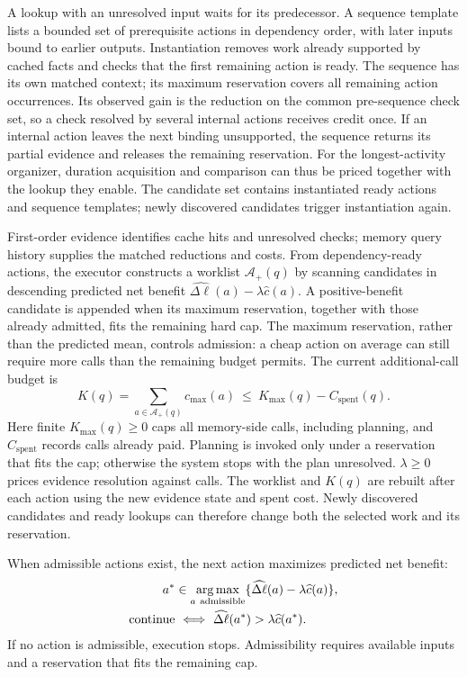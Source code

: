 A lookup with an unresolved input waits for its predecessor. A sequence
template lists a bounded set of prerequisite actions in dependency order,
with later inputs bound to earlier outputs. Instantiation removes work
already supported by cached facts and checks that the first remaining
action is ready. The sequence has its own matched context; its maximum
reservation covers all remaining action occurrences. Its observed gain
is the reduction on the common pre-sequence check set, so a check
resolved by several internal actions receives credit once.
If an internal action leaves the next binding unsupported, the sequence
returns its partial evidence and releases the remaining reservation.
For the longest-activity organizer, duration acquisition and comparison
can thus be priced together with the lookup they enable. The candidate
set contains instantiated ready actions and sequence templates; newly
discovered candidates trigger instantiation again.

First-order evidence identifies cache hits and unresolved checks;
memory query history supplies the matched reductions and costs.
From dependency-ready actions, the executor constructs a worklist
$\mathcal A_+(q)$ by scanning candidates in descending predicted net benefit
$\widehat{\Delta\ell}(a)-\lambda\widehat c(a)$.
A positive-benefit candidate is appended when its maximum reservation,
together with those already admitted, fits the remaining hard cap.
The maximum reservation, rather than the predicted mean, controls
admission: a cheap action on average can still require more calls than
the remaining budget permits.
The current additional-call budget is
\begin{equation}
\label{eq:new-adaptive-budget}
K(q)=\sum_{a\in\mathcal A_+(q)}c_{\max}(a)
\ \leq\ K_{\max}(q)-C_{\mathrm{spent}}(q).
\end{equation}
Here finite $K_{\max}(q)\geq0$ caps all memory-side calls, including planning, and
$C_{\mathrm{spent}}$ records calls already paid.
Planning is invoked only under a reservation that fits the cap; otherwise
the system stops with the plan unresolved.
$\lambda\geq0$ prices evidence resolution against calls.
The worklist and $K(q)$ are rebuilt after each action using the new
evidence state and spent cost. Newly discovered candidates and ready
lookups can therefore change both the selected work and its reservation.

When admissible actions exist, the next action maximizes predicted net benefit:
\begin{equation}
\label{eq:short}
\begin{aligned}
a^*&\in\operatorname*{arg\,max}_{a\ \mathrm{admissible}}
 \{\widehat{\Delta\ell}(a)-\lambda\widehat c(a)\},\\
\mathrm{continue}&\ \Longleftrightarrow\
 \widehat{\Delta\ell}(a^*)>\lambda\widehat c(a^*).
\end{aligned}
\end{equation}
If no action is admissible, execution stops. Admissibility requires
available inputs and a reservation that fits the remaining cap.

